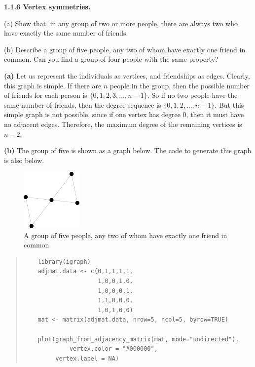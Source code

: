 \documentclass{article}
\begin{document}
\bigskip\par\textbf{1.1.6 Vertex symmetries.}
\par\smallskip
(a) Show that, in any group of two or more people, there are always two who have exactly the same number of friends.\par
(b) Describe a group of five people, any two of whom have exactly one friend in common. Can you find a group of four people with the same property?
\par\smallskip\textbf{(a)} Let us represent the individuals as vertices, and friendships as edges. Clearly, this graph is simple. If there are $n$ people in the group, then the possible number of friends for each person is $\{0, 1, 2, 3, \ldots, n-1 \}$. So if no two people have the same number of friends, then the degree sequence is $\{0, 1, 2, \ldots, n-1\}$. But this simple graph is not possible, since if one vertex has degree 0, then it must have no adjacent edges. Therefore, the maximum degree of the remaining vertices is $n-2$.
\par\textbf{(b)} The group of five is shown as a graph below. The code to generate this graph is also below. 
\begin{figure}[h]
\centering
\includegraphics[width = 30mm]{1.1.6b.pdf}
\caption{\footnotesize{A group of five people, any two of whom have exactly one friend in common}}
\end{figure}
\begin{quote}
\begin{verbatim}
	library(igraph)
	adjmat.data <- c(0,1,1,1,1,
	                 1,0,0,1,0,
	                 1,0,0,0,1,
	                 1,1,0,0,0,
	                 1,0,1,0,0)
	mat <- matrix(adjmat.data, nrow=5, ncol=5, byrow=TRUE)
	
	plot(graph_from_adjacency_matrix(mat, mode="undirected"),
		     vertex.color = "#000000", 
	     vertex.label = NA)
\end{verbatim}
\end{quote}
\end{document}

